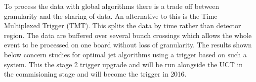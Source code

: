 To process the data with global algorithms there is a trade off between granularity and the sharing of data. An alternative to this is the Time Multiplexed Trigger (TMT)\cite{rose}. This splits the data by time rather than detector region. The data are buffered over several bunch crossings which allows the whole event to be processed on one board without loss of granularity. The results shown below concern studies for optimal jet algorithms using a trigger based on such a system. This the stage 2 trigger upgrade and will be run alongside the UCT in the commisioning stage and will become the trigger in 2016. 